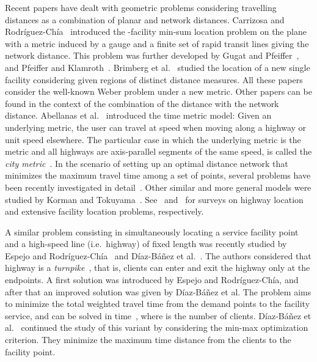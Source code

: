 \documentclass[11pt,a4paper,oneside,onecolumn]{article}
\begin{document}
Recent papers have dealt with geometric problems considering
travelling distances as a combination of planar and network distances.
Carrizosa and Rodr\'iguez-Ch\'ia~\cite{carrisoza1997} introduced the
-facility min-sum location problem on the plane with a metric 
induced by a gauge and a finite set of rapid transit lines giving the network distance.
This problem was further developed by 
Gugat and Pfeiffer~\cite{gugat2007}, and Pfeiffer and Klamroth~\cite{pfeiffer2008}.
Brimberg et al.~\cite{brimberg2003,brimberg2005} studied 
the location of a new single facility
considering given regions of distinct distance measures.
All these papers consider the well-known
Weber problem under a new metric.
Other papers can be found in the context of the combination of the 
 distance with the network distance.
Abellanas et al.~\cite{abellanas03}
introduced the time metric model: Given an
underlying metric, the user can travel at speed  when moving
along a highway  or unit speed elsewhere. The particular case in
which the underlying metric is the  metric and all highways are
axis-parallel segments of the same speed, is called the {\em city
metric}~\cite{aichholzer02}. 
In the scenario of setting up an optimal distance network
that minimizes the maximum travel time among a
set of points, several problems have been recently investigated in detail~\cite{ahn07,aloupis10,cardinal08}. Other similar and more general models
were studied by Korman and Tokuyama~\cite{korman08}.
See~\cite{phdkorman} and~\cite{dbanezMS04} for surveys on highway location 
and extensive facility location problems, respectively.

A similar problem consisting in simultaneously locating a
service facility point and a high-speed line (i.e.\ highway) 
of fixed length was recently studied by
Espejo and Rodr\'{i}guez-Ch\'{i}a~\cite{espejo11} and D\'iaz-B\'a\~nez et
al.~\cite{diaz-banez11}. The authors considered that highway is a 
\emph{turnpike}~\cite{korman08}, that is, clients can enter
and exit the highway only at the endpoints. 
A first solution was introduced by Espejo and Rodr\'{i}guez-Ch\'ia, and
after that an improved solution was given by D\'iaz-B\'a\~nez et al. 
The problem aims to minimize
the total weighted travel time from the demand points to the facility
service, and can be solved in  time~\cite{diaz-banez11}, where 
 is the number of clients.
D\'iaz-B\'a\~nez et al.~\cite{diaz-banez11-3}
continued the study of this variant by considering the min-max
optimization criterion. They minimize the maximum time distance from
the clients to the facility point.
\end{document}
